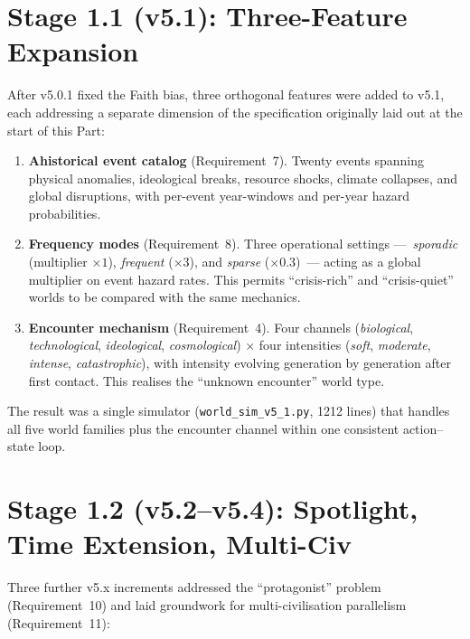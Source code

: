 \section{Stage 1.1 (v5.1): Three-Feature Expansion}
\label{sec:stage11-v51}

After v5.0.1 fixed the Faith bias, three orthogonal features were
added to v5.1, each addressing a separate dimension of the
specification originally laid out at the start of this Part:

\begin{enumerate}
\item \textbf{Ahistorical event catalog} (Requirement~7).
  Twenty events spanning physical anomalies, ideological breaks,
  resource shocks, climate collapses, and global disruptions, with
  per-event year-windows and per-year hazard probabilities.
\item \textbf{Frequency modes} (Requirement~8).
  Three operational settings —~\emph{sporadic} (multiplier
  $\times 1$), \emph{frequent} ($\times 3$), and \emph{sparse}
  ($\times 0.3$)~— acting as a global multiplier on event hazard
  rates. This permits ``crisis-rich'' and ``crisis-quiet'' worlds to
  be compared with the same mechanics.
\item \textbf{Encounter mechanism} (Requirement~4).
  Four channels (\emph{biological},
  \emph{technological}, \emph{ideological}, \emph{cosmological}) ×
  four intensities (\emph{soft}, \emph{moderate}, \emph{intense},
  \emph{catastrophic}), with intensity evolving generation by
  generation after first contact. This realises the ``unknown
  encounter'' world type.
\end{enumerate}

The result was a single simulator (\texttt{world\_sim\_v5\_1.py},
1212 lines) that handles all five world families plus the
encounter channel within one consistent action--state loop.

\section{Stage 1.2 (v5.2--v5.4): Spotlight, Time Extension, Multi-Civ}
\label{sec:stage12-v52-v54}

Three further v5.x increments addressed the ``protagonist'' problem
(Requirement~10) and laid groundwork for multi-civilisation
parallelism (Requirement~11):

